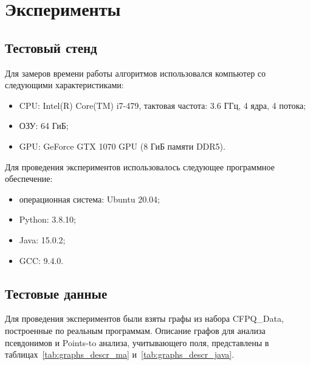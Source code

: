 \section{Эксперименты}

\subsection{Тестовый стенд}

Для замеров времени работы алгоритмов использовался компьютер со следующими характеристиками:
\begin{itemize}
    \item CPU: Intel(R) Core(TM) i7-479, тактовая частота: 3.6 ГГц, 4 ядра, 4 потока;
    \item ОЗУ: 64 ГиБ;
    \item GPU: GeForce GTX 1070 GPU (8 ГиБ памяти DDR5).
\end{itemize}


Для проведения экспериментов использовалось следующее программное обеспечение:
\begin{itemize}
    \item операционная система: Ubuntu 20.04;
    \item Python: 3.8.10;
    \item Java: 15.0.2;
    \item GCC: 9.4.0.
\end{itemize}

\subsection{Тестовые данные}
Для проведения экспериментов были взяты графы из набора CFPQ\_Data, построенные по реальным программам. Описание графов для анализа псевдонимов и Points-to анализа, учитывающего поля, представлены в таблицах~\ref{tab:graphs_descr_ma} и~\ref{tab:graphs_descr_java}. 

